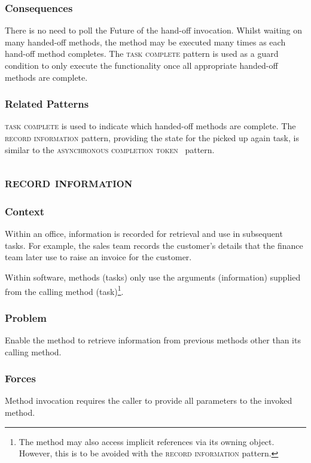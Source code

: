 \documentclass[prodmode]{style/acmlarge}
\begin{document}
\subsubsection*{Consequences} There is no need to poll the Future of the
hand-off invocation.  Whilst waiting on many handed-off methods, the method may be
executed many times as each hand-off method completes.  The \textsc{task
complete} pattern is used as a guard condition to only execute the functionality
once all appropriate handed-off methods are complete.

\subsubsection*{Related Patterns} \textsc{task complete} is used to indicate
which handed-off methods are complete.  The \textsc{record information} pattern,
providing the state for the picked up again task, is similar to the
\textsc{asynchronous completion token}~\cite{posa} pattern.



\subsection{\textsc{\textbf{record information}}}

\subsubsection*{Context} Within an office, information is recorded for retrieval
and use in subsequent tasks.  For example, the sales team records the customer's
details that the finance team later use to raise an invoice for the customer.

Within software, methods (tasks) only use the arguments (information) supplied
from the calling method (task)\footnote{The method may also access implicit
references via its owning object.  However, this is to be avoided with the
\textsc{record information} pattern.}.

\subsubsection*{\textbf{Problem}} Enable the method to retrieve information from
previous methods other than its calling method.

\subsubsection*{Forces} Method invocation requires the caller to provide all
parameters to the invoked method.
\end{document}
